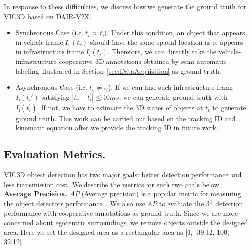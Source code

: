 In response to these difficulties, we discuss how we generate the ground truth for VIC3D based on DAIR-V2X.
\begin{itemize}
    \item Synchronous Case (i.e. $t_{v}\approx t_{i}$).
    Under this condition, an object that appears in vehicle frame $I_{v}(t_{v})$ should have the same spatial location as it appears in infrastructure frame $I_{i}(t_{i})$.
    Therefore, we can directly take the vehicle-infrastructure cooperative 3D annotations obtained by semi-automatic labeling illustrated in Section~\ref{sec:DataAcquisition} as ground truth.
    \item Asynchronous Case (i.e. $t_{v} \neq t_{i}$).
    If we can find such infrastructure frame $I_i(t_i')$ satisfying $|t_v-t_{i}^{'}|\le 10ms$, we can generate ground truth with $I_i(t_{i}^{'})$.
    If not, we have to estimate the 3D states of objects at $t_v$ to generate ground truth.
    This work can be carried out based on the tracking ID and kinematic equation after we provide the tracking ID in future work.
\end{itemize}

\subsection{Evaluation Metrics.}
VIC3D object detection has two major goals: better detection performance and less transmission cost.
We describe the metrics for such two goals below. \\

\noindent\textbf{Average Precision.}
$AP$ (Average precision) is a popular metric for measuring the object detectors performance~\cite{everingham2010pascal}.
We also use $AP$ to evaluate the 3d detection performance with cooperative annotations as ground truth.
Since we are more concerned about egocentric surroundings, we remove objects outside the designed area.
Here we set the designed area as a rectangular area as [0, -39.12, 100, 39.12].

